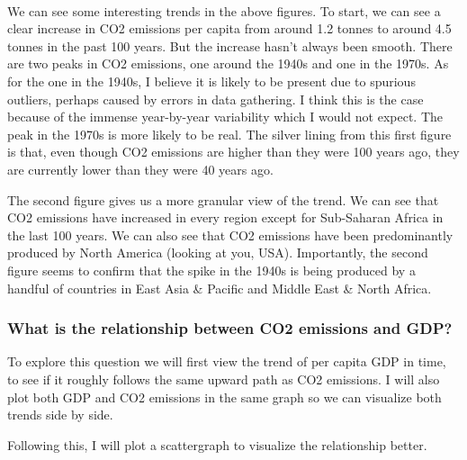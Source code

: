 \documentclass[11pt]{article}
\begin{document}
    \begin{center}
    \end{center}
    { \hspace*{\fill} \\}
    
    We can see some interesting trends in the above figures. To start, we
can see a clear increase in CO2 emissions per capita from around 1.2
tonnes to around 4.5 tonnes in the past 100 years. But the increase
hasn't always been smooth. There are two peaks in CO2 emissions, one
around the 1940s and one in the 1970s. As for the one in the 1940s, I
believe it is likely to be present due to spurious outliers, perhaps
caused by errors in data gathering. I think this is the case because of
the immense year-by-year variability which I would not expect. The peak
in the 1970s is more likely to be real. The silver lining from this
first figure is that, even though CO2 emissions are higher than they
were 100 years ago, they are currently lower than they were 40 years
ago.

    The second figure gives us a more granular view of the trend. We can see
that CO2 emissions have increased in every region except for Sub-Saharan
Africa in the last 100 years. We can also see that CO2 emissions have
been predominantly produced by North America (looking at you, USA).
Importantly, the second figure seems to confirm that the spike in the
1940s is being produced by a handful of countries in East Asia \&
Pacific and Middle East \& North Africa.

    \hypertarget{what-is-the-relationship-between-co2-emissions-and-gdp}{%
\subsubsection{What is the relationship between CO2 emissions and
GDP?}\label{what-is-the-relationship-between-co2-emissions-and-gdp}}

    To explore this question we will first view the trend of per capita GDP
in time, to see if it roughly follows the same upward path as CO2
emissions. I will also plot both GDP and CO2 emissions in the same graph
so we can visualize both trends side by side.

Following this, I will plot a scattergraph to visualize the relationship
better.
\end{document}
